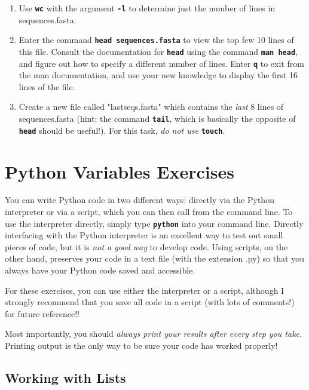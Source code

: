 \documentclass{article}[12pt]
\newcommand{\code}[1]{\textbf{\texttt{#1}}}
\begin{document}
\begin{enumerate}[itemsep=5ex]
\begin{enumerate}[itemsep=2ex]
		\item Use \code{wc} with the argument \code{-l} to determine just the number of lines in sequences.fasta.
		
		\item Enter the command \code{head sequences.fasta} to view the top few 10 lines of this file. Consult the documentation for \code{head} using the command \code{man head}, and figure out how to specify a different number of lines. Enter \code{q} to exit from the man documentation, and use your new knowledge to display the first 16 lines of the file.
		 
		\item Create a new file called "lastseqs.fasta" which contains the \emph{last} 8 lines of sequences.fasta (hint: the command \code{tail}, which is basically the opposite of \code{head} should be useful!). For this task, \emph{do not use} \code{touch}.
	\end{enumerate}
\end{enumerate}
			
\vspace{2.25cm}

\section{Python Variables Exercises}

You can write Python code in two different ways: directly via the Python interpreter or via a script, which you can then call from the command line. To use the interpreter directly, simply type \code{python} into your command line. Directly interfacing with the Python interpreter is an excellent way to test out small pieces of code, but it is \emph{not a good way} to develop code. Using scripts, on the other hand, preserves your code in a text file (with the extension .py) so that you always have your Python code saved and accessible.

For these exercises, you can use either the interpreter or a script, although I strongly recommend that you save all code in a script (with lots of comments!) for future reference!!

Most importantly, you should \emph{always print your results after every step you take}. Printing output is the only way to be sure your code has worked properly!

\vspace{1.5cm}

\subsection{Working with Lists}
\end{document}
